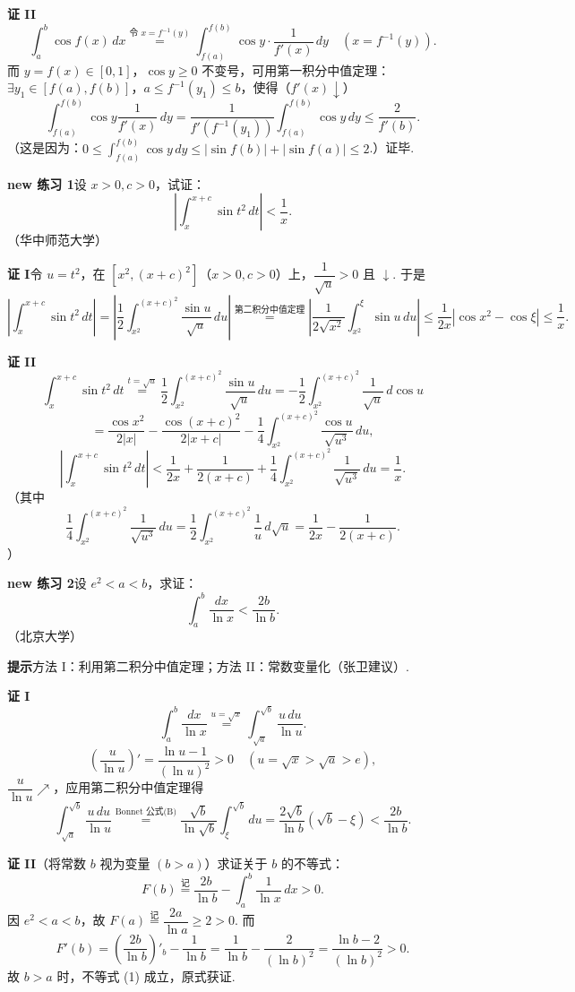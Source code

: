 \documentclass[UTF8, 12pt, fontset=fandol, oneside]{ctexart}
\begin{document}
\noindent\textbf{证 II}\quad
\[
\int_a^b\cos f(x)\,dx
\stackrel{\text{令 }x=f^{-1}(y)}{=}
\int_{f(a)}^{f(b)}\cos y\cdot\frac1{f'(x)}\,dy\quad(x=f^{-1}(y)).
\]
而 $y=f(x)\in[0,1]$，$\cos y\ge0$ 不变号，可用第一积分中值定理：$\exists y_1\in[f(a),f(b)]$，$a\le f^{-1}(y_1)\le b$，使得（$f'(x)\downarrow$）
\[
\int_{f(a)}^{f(b)}\cos y\frac1{f'(x)}\,dy
=\frac1{f'(f^{-1}(y_1))}\int_{f(a)}^{f(b)}\cos y\,dy
\le\frac2{f'(b)}.
\]
（这是因为：$0\le\displaystyle\int_{f(a)}^{f(b)}\cos y\,dy\le|\sin f(b)|+|\sin f(a)|\le2$.）证毕.

\noindent\textbf{new 练习 1}\quad 设 $x>0,c>0$，试证：
\[
\left|\int_x^{x+c}\sin t^2\,dt\right|<\frac1x.
\]
（华中师范大学）

\noindent\textbf{证 I}\quad 令 $u=t^2$，在 $[x^2,(x+c)^2]$（$x>0,c>0$）上，$\dfrac1{\sqrt u}>0$ 且 $\downarrow$. 于是
\[
\left|\int_x^{x+c}\sin t^2\,dt\right|
=\left|\frac12\int_{x^2}^{(x+c)^2}\frac{\sin u}{\sqrt u}\,du\right|
\stackrel{\text{第二积分中值定理}}{=}
\left|\frac1{2\sqrt{x^2}}\int_{x^2}^{\xi}\sin u\,du\right|
\le\frac1{2x}|\cos x^2-\cos\xi|\le\frac1x.
\]

\noindent\textbf{证 II}\quad
\[
\int_x^{x+c}\sin t^2\,dt
\stackrel{t=\sqrt u}{=}\frac12\int_{x^2}^{(x+c)^2}\frac{\sin u}{\sqrt u}\,du
=-\frac12\int_{x^2}^{(x+c)^2}\frac1{\sqrt u}\,d\cos u
\]
\[
=\frac{\cos x^2}{2|x|}-\frac{\cos(x+c)^2}{2|x+c|}
-\frac14\int_{x^2}^{(x+c)^2}\frac{\cos u}{\sqrt{u^3}}\,du,
\]
\[
\left|\int_x^{x+c}\sin t^2\,dt\right|
<\frac1{2x}+\frac1{2(x+c)}+\frac14\int_{x^2}^{(x+c)^2}\frac1{\sqrt{u^3}}\,du
=\frac1x.
\]
（其中
\[
\frac14\int_{x^2}^{(x+c)^2}\frac1{\sqrt{u^3}}\,du
=\frac12\int_{x^2}^{(x+c)^2}\frac1u\,d\sqrt u
=\frac1{2x}-\frac1{2(x+c)}.
\]
）

\noindent\textbf{new 练习 2}\quad 设 $e^2<a<b$，求证：
\[
\int_a^b\frac{dx}{\ln x}<\frac{2b}{\ln b}.
\]
（北京大学）

\noindent\textbf{提示}\quad 方法 I：利用第二积分中值定理；方法 II：常数变量化（张卫建议）.

\noindent\textbf{证 I}\quad
\[
\int_a^b\frac{dx}{\ln x}\stackrel{u=\sqrt x}{=}
\int_{\sqrt a}^{\sqrt b}\frac{u\,du}{\ln u}.
\]
\[
\left(\frac u{\ln u}\right)'=\frac{\ln u-1}{(\ln u)^2}>0
\quad(u=\sqrt x>\sqrt a>e),
\]
$\dfrac u{\ln u}\nearrow$，应用第二积分中值定理得
\[
\int_{\sqrt a}^{\sqrt b}\frac{u\,du}{\ln u}
\stackrel{\text{Bonnet 公式(B)}}{=}
\frac{\sqrt b}{\ln\sqrt b}\int_\xi^{\sqrt b}du
=\frac{2\sqrt b}{\ln b}(\sqrt b-\xi)<\frac{2b}{\ln b}.
\]

\noindent\textbf{证 II}\quad （将常数 $b$ 视为变量 $(b>a)$）求证关于 $b$ 的不等式：
\[
F(b)\stackrel{\text{记}}{=}\frac{2b}{\ln b}-\int_a^b\frac1{\ln x}\,dx>0.
\tag{1}
\]
因 $e^2<a<b$，故 $F(a)\stackrel{\text{记}}{=}\dfrac{2a}{\ln a}\ge2>0$. 而
\[
F'(b)=\left(\frac{2b}{\ln b}\right)'_b-\frac1{\ln b}
=\frac1{\ln b}-\frac2{(\ln b)^2}
=\frac{\ln b-2}{(\ln b)^2}>0.
\]
故 $b>a$ 时，不等式 (1) 成立，原式获证.
\end{document}
